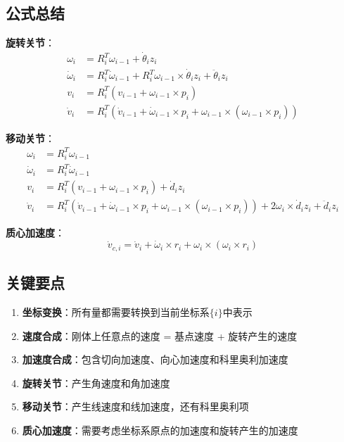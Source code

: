 \documentclass[12pt,a4paper]{article}
\begin{document}
\subsection{公式总结}

\textbf{旋转关节}：
\begin{align}
\omega_i &= R_i^T \omega_{i-1} + \dot{\theta}_i z_i \\
\dot{\omega}_i &= R_i^T \dot{\omega}_{i-1} + R_i^T \omega_{i-1} \times \dot{\theta}_i z_i + \ddot{\theta}_i z_i \\
v_i &= R_i^T (v_{i-1} + \omega_{i-1} \times p_i) \\
\dot{v}_i &= R_i^T (\dot{v}_{i-1} + \dot{\omega}_{i-1} \times p_i + \omega_{i-1} \times (\omega_{i-1} \times p_i))
\end{align}

\textbf{移动关节}：
\begin{align}
\omega_i &= R_i^T \omega_{i-1} \\
\dot{\omega}_i &= R_i^T \dot{\omega}_{i-1} \\
v_i &= R_i^T (v_{i-1} + \omega_{i-1} \times p_i) + \dot{d}_i z_i \\
\dot{v}_i &= R_i^T (\dot{v}_{i-1} + \dot{\omega}_{i-1} \times p_i + \omega_{i-1} \times (\omega_{i-1} \times p_i)) + 2\omega_i \times \dot{d}_i z_i + \ddot{d}_i z_i
\end{align}

\textbf{质心加速度}：
\begin{equation}
\dot{v}_{c,i} = \dot{v}_i + \dot{\omega}_i \times r_i + \omega_i \times (\omega_i \times r_i)
\end{equation}

\subsection{关键要点}

\begin{enumerate}
\item \textbf{坐标变换}：所有量都需要转换到当前坐标系$\{i\}$中表示
\item \textbf{速度合成}：刚体上任意点的速度 = 基点速度 + 旋转产生的速度
\item \textbf{加速度合成}：包含切向加速度、向心加速度和科里奥利加速度
\item \textbf{旋转关节}：产生角速度和角加速度
\item \textbf{移动关节}：产生线速度和线加速度，还有科里奥利项
\item \textbf{质心加速度}：需要考虑坐标系原点的加速度和旋转产生的加速度
\end{enumerate}
\end{document}
